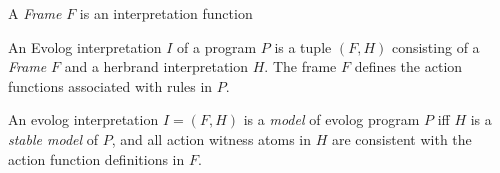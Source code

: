\begin{definition}[Frame]
\label{def:evolog-frame}
A \emph{Frame} $F$ is an interpretation function 
\end{definition}

\begin{definition}
\label{def:evolog-interpretation}
An Evolog interpretation $I$ of a program $P$ is a tuple $(F, H)$ consisting of a \emph{Frame} $F$ and a herbrand interpretation $H$. The frame $F$ defines the action functions associated with rules in $P$.
\end{definition}

\begin{definition}
An evolog interpretation $I = (F, H)$ is a \emph{model} of evolog program $P$ iff $H$ is a \emph{stable model} of $P$, and all action witness atoms in $H$ are consistent with the action function definitions in $F$.
\end{definition}